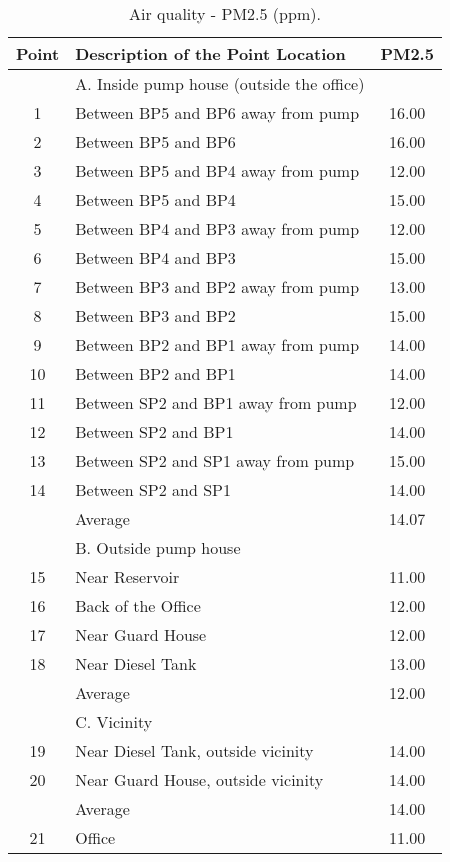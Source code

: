 \begin{table}[!h]
	\caption{Air quality - PM2.5 (ppm).}
	\label{ch04_tbl_wem03}
	{\footnotesize
\begin{tabular}{c|l|c}
	\hline
	Point & Description of the Point Location & PM2.5 \\ 
	\hline
	& A. Inside pump house (outside the office) &  \\ 
	1 & Between BP5 and BP6 away from pump & 16.00 \\ 
	2 & Between BP5 and BP6 & 16.00 \\ 
	3 & Between BP5 and BP4 away from pump & 12.00 \\ 
	4 & Between BP5 and BP4 & 15.00 \\ 
	5 & Between BP4 and BP3 away from pump & 12.00 \\ 
	6 & Between BP4 and BP3 & 15.00 \\ 
	7 & Between BP3 and BP2 away from pump & 13.00 \\ 
	8 & Between BP3 and BP2 & 15.00 \\ 
	9 & Between BP2 and BP1 away from pump & 14.00 \\ 
	10 & Between BP2 and BP1 & 14.00 \\ 
	11 & Between SP2 and BP1 away from pump & 12.00 \\ 
	12 & Between SP2 and BP1 & 14.00 \\ 
	13 & Between SP2 and SP1 away from pump & 15.00 \\ 
	14 & Between SP2 and SP1 & 14.00 \\ 
	& Average & 14.07 \\ 
	\hline
	& B. Outside pump house &  \\ 
	15 & Near Reservoir & 11.00 \\ 
	16 & Back of the Office & 12.00 \\ 
	17 & Near Guard House & 12.00 \\ 
	18 & Near Diesel Tank & 13.00 \\ 
	& Average & 12.00 \\ 
	\hline
	& C. Vicinity &  \\ 
	19 & Near Diesel Tank, outside vicinity & 14.00 \\ 
	20 & Near Guard House, outside vicinity & 14.00 \\ 
	& Average & 14.00 \\ 
	\hline
	21 & Office & 11.00 \\ 
	\hline
\end{tabular}
	}
\end{table}


